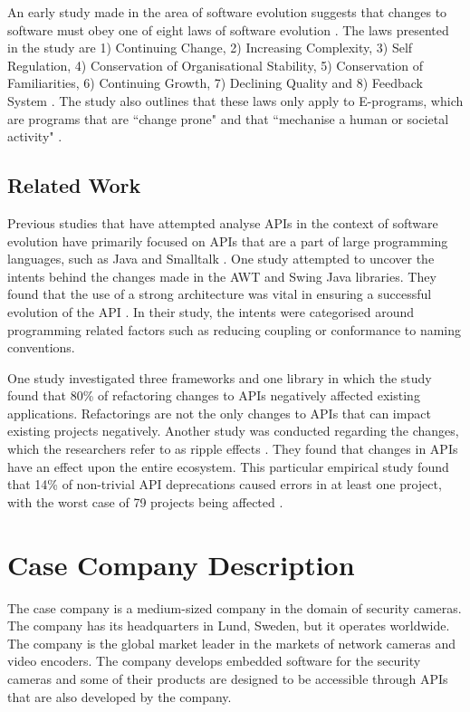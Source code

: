 \documentclass{sig-alternate}
\begin{document}
An early study made in the area of software evolution suggests that changes to software must obey one of eight laws of software evolution \cite{lehman1980programs}. The laws presented in the study are 1) Continuing Change, 2) Increasing Complexity, 3) Self Regulation, 4) Conservation of Organisational Stability, 5) Conservation of Familiarities, 6) Continuing Growth, 7) Declining Quality and 8) Feedback System \cite{lehman1980programs}. The study also outlines that these laws only apply to E-programs, which are programs that are ``change prone" and that ``mechanise a human or societal activity" \cite{lehman1980programs}.

\subsection{Related Work} \label{related_work}
Previous studies that have attempted analyse APIs in the context of software evolution have primarily focused on APIs that are a part of large programming languages, such as Java \cite{hou2011exploring} \cite{shi2011empirical} and Smalltalk \cite{robbes2012developers}. One study \cite{hou2011exploring} attempted to uncover the intents behind the changes made in the AWT and Swing Java libraries. They found that the use of a strong architecture was vital in ensuring a successful evolution of the API \cite{hou2011exploring}. In their study, the intents were categorised around programming related factors such as reducing coupling or conformance to naming conventions.

One study \cite{dig2005role} investigated three frameworks and one library in which the study found that 80\% of refactoring changes to APIs negatively affected existing applications. Refactorings are not the only changes to APIs that can impact existing projects negatively. Another study was conducted regarding the changes, which the researchers refer to as ripple effects \cite{robbes2012developers}. They found that changes in APIs have an effect upon the entire ecosystem. This particular empirical study found that 14\% of non-trivial API deprecations caused errors in at least one project, with the worst case of 79 projects being affected \cite{robbes2012developers}.


\section{Case Company Description} \label{case_company_description}
The case company is a medium-sized company in the domain of security cameras. The company has its headquarters in Lund, Sweden, but it operates worldwide. The company is the global market leader in the markets of network cameras and video encoders. The company develops embedded software for the security cameras and some of their products are designed to be accessible through APIs that are also developed by the company. 
\end{document}
